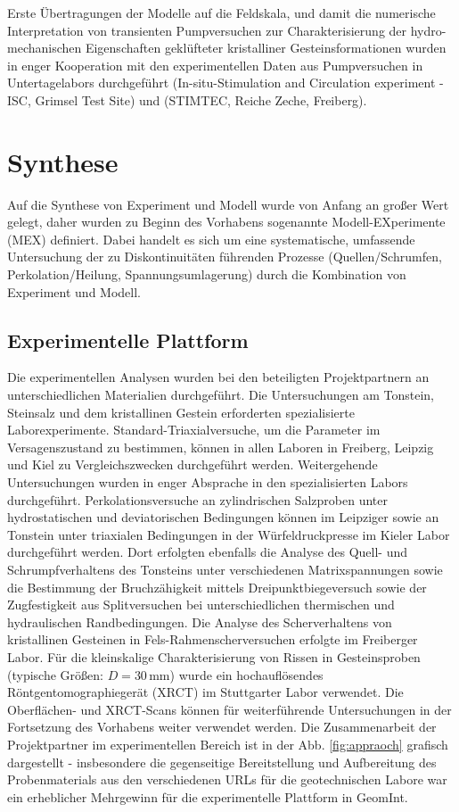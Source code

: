 Erste Übertragungen der Modelle auf die Feldskala, und damit die numerische Interpretation von transienten Pumpversuchen zur Charakterisierung der hydro-mechanischen Eigenschaften geklüfteter kristalliner Gesteinsformationen wurden in enger Kooperation mit den experimentellen Daten aus Pumpversuchen 
in Untertagelabors durchgeführt \cite{steeb-2020b} (In-situ-Stimulation and Circulation experiment - ISC, Grimsel Test Site) und \cite{steeb-2020c} (STIMTEC, Reiche Zeche, Freiberg).

\section*{Synthese}
\label{sec:syn}

Auf die Synthese von Experiment und Modell wurde von Anfang an gro{\ss}er Wert gelegt, daher wurden zu Beginn des Vorhabens sogenannte Modell-EXperimente (MEX) definiert.
Dabei handelt es sich um eine systematische, umfassende Untersuchung der zu Diskontinuitäten führenden Prozesse (Quellen/Schrumfen, Perkolation/Heilung, Spannungsumlagerung) durch die Kombination von Experiment und Modell.

\subsection*{Experimentelle Plattform}
\label{sec:exp}

Die experimentellen Analysen wurden bei den beteiligten Projektpartnern an unterschiedlichen Materialien durchgeführt. Die Untersuchungen am Tonstein, Steinsalz und dem kristallinen Gestein erforderten spezialisierte Laborexperimente. Standard-Triaxialversuche, um die Parameter im Versagenszustand zu bestimmen, können in allen Laboren in Freiberg, Leipzig und Kiel zu Vergleichszwecken durchgeführt werden.
Weitergehende Untersuchungen wurden in enger Absprache in den spezialisierten Labors durchgeführt.
%
Perkolationsversuche an zylindrischen Salzproben unter hydrostatischen und deviatorischen Bedingungen können im Leipziger sowie an Tonstein unter triaxialen Bedingungen in der Würfeldruckpresse im Kieler Labor durchgeführt werden. Dort erfolgten ebenfalls die Analyse des Quell- und Schrumpfverhaltens des Tonsteins unter verschiedenen Matrixspannungen sowie die Bestimmung der Bruchzähigkeit mittels Dreipunktbiegeversuch sowie der Zugfestigkeit aus Splitversuchen bei unterschiedlichen thermischen und hydraulischen Randbedingungen.
%
Die Analyse des Scherverhaltens von kristallinen Gesteinen in Fels-Rahmenscherversuchen erfolgte im Freiberger Labor. Für die kleinskalige Charakterisierung von Rissen in Gesteinsproben (typische Grö{\ss}en: $D=30$\,mm) wurde ein hochauflösendes Röntgentomographiegerät (XRCT) im Stuttgarter Labor verwendet. 
Die Oberflächen- und XRCT-Scans können für weiterführende  Untersuchungen in der Fortsetzung des Vorhabens weiter verwendet werden.
%
Die Zusammenarbeit der Projektpartner im experimentellen Bereich ist in der Abb. \ref{fig:appraoch} grafisch dargestellt - insbesondere die gegenseitige Bereitstellung und Aufbereitung des Probenmaterials aus den verschiedenen URLs für die geotechnischen Labore war ein erheblicher Mehrgewinn für die experimentelle Plattform in GeomInt.

